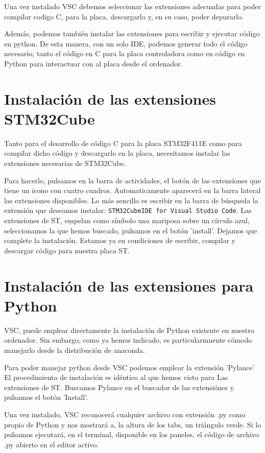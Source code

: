 \documentclass[10pt,a4paper]{report}
\begin{document}
Una vez instalado VSC debemos seleccionar las extensiones adecuadas para poder compilar codigo C, para la placa, descargarlo y, en su caso, poder depurarlo.

Además, podemos también instalar las extensiones para escribir y ejecutar código en python. De esta manera, con un solo IDE, podemos generar todo el código necesario; tanto el código en C para la placa controladora como en código en Python para interactuar con al placa desde el ordenador.

\section{Instalación de las extensiones STM32Cube}
Tanto para el desarrollo de código C para la placa STM32F411E como para compilar dicho código y descargarlo en la placa, necesitamos instalar las extensiones necesarias de STM32Cube.

Para hacerlo, pulsamos en la barra de actividades, el botón de las extensiones que tiene un icono con cuatro cuadros. Automaticamente aparecerá en la barra lateral las extensiones disponibles. Lo más sencillo es escribir en la barra de búsqueda la extensión que deseamos instalar: \texttt{STM32CubeIDE for Visual Studio Code}. Las extensiones de ST, empelan como símbolo una mariposa sobre un círculo azul, seleccionamos la que hemos buscado, pulsamos en el botón 'install'. Dejamos que complete la instalación. Estamos ya en condiciones de escribir, compilar y descargar código para nuestra placa ST.

\section{Instalación de las extensiones para Python}
VSC, puede emplear directamente la instalación de Python existente en nuestro ordenador. Sin embargo, como ya hemos indicado, es particularmnente cómodo manejarlo desde la distribución de anaconda.

Para poder manejar python desde VSC podemos emplear la extensión 'Pylance' El procedimiento de instalación es idéntico al que hemos visto para Las extensiones de ST. Buscamos Pylance en el buscador de las extensiónes y pulsamos el botón 'Install'.

Una vez instalado, VSC reconocerá cualquier archivo con extensión .py como propio de Python y nos mostrará a, la altura de los tabs, un triángulo verde. Si lo pulsamos ejecutará, en el terminal, disponible en los paneles, el código de archivo .py abierto en el editor activo.
\end{document}
